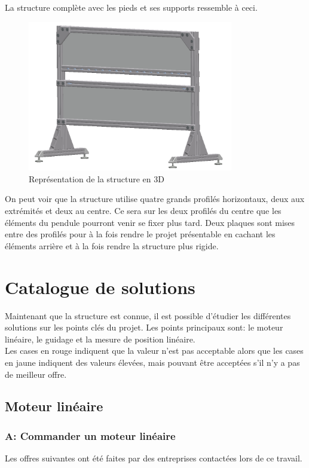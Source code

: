 La structure complète avec les pieds et ses supports ressemble à ceci.
\begin{figure}[H]
  \centering
  \includegraphics[width = 0.8\textwidth]{assets/figures/Structure.png}
  \caption{Représentation de la structure en 3D}
  \label{fig:DescStruct}
\end{figure}

On peut voir que la structure utilise quatre grands profilés horizontaux, deux aux extrémités et deux au centre. Ce sera sur les deux profilés du centre que
les éléments du pendule pourront venir se fixer plus tard. Deux plaques sont mises entre des profilés pour à la fois rendre le projet présentable
en cachant les éléments arrière et à la fois rendre la structure plus rigide.

\section{Catalogue de solutions}\label{sec:CatSol}
Maintenant que la structure est connue, il est possible d'étudier les différentes solutions sur les points clés du projet.
Les points principaux sont: le moteur linéaire, le guidage et la mesure de position linéaire.\\

Les cases en rouge indiquent que la valeur n'est pas acceptable alors que les cases en jaune indiquent des valeurs élevées, mais pouvant être
acceptées s'il n'y a pas de meilleur offre.

\subsection{Moteur linéaire}
\subsubsection{A: Commander un moteur linéaire}
Les offres suivantes ont été faites par des entreprises contactées lors de ce travail.

